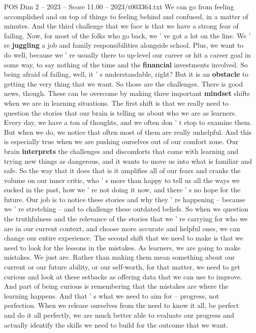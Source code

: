 \begin{textsample}{POS Dim 2 – 2023 – Score 11.00 – 2023/t003364.txt}
We can go from feeling accomplished and on top of things to feeling behind and confused, in a matter of minutes.
And the third challenge that we face is that we have a strong fear of failing.
Now, for most of the folks who go back, we ' ve got a lot on the line.
We ' re \textbf{juggling} a job and family responsibilities alongside school.
Plus, we want to do well, because we ' re usually there to up-level our career or hit a career goal in some way, to say nothing of the time and the \textbf{financial} investments involved.
So being afraid of failing, well, it ' s understandable, right?
But it is an \textbf{obstacle} to getting the very thing that we want.
So those are the challenges.
There is good news, though.
These can be overcome by making three important \textbf{mindset} shifts when we are in learning situations.
The first shift is that we really need to question the stories that our brain is telling us about who we are as learners.
Every day, we have a ton of thoughts, and we often don ' t stop to examine them.
But when we do, we notice that often most of them are really unhelpful.
And this is especially true when we are pushing ourselves out of our comfort zone.
Our brain \textbf{interprets} the challenges and discomforts that come with learning and trying new things as dangerous, and it wants to move us into what is familiar and safe.
So the way that it does that is it amplifies all of our fears and cranks the volume on our inner critic, who ' s more than happy to tell us all the ways we sucked in the past, how we ' re not doing it now, and there ' s no hope for the future.
Our job is to notice these stories and why they ' re happening -- because we ' re stretching -- and to challenge these outdated beliefs.
So when we question the truthfulness and the relevance of the stories that we ' re carrying for who we are in our current context, and choose more accurate and helpful ones, we can change our entire experience.
The second shift that we need to make is that we need to look for the lessons in the mistakes.
As learners, we are going to make mistakes.
We just are.
Rather than making them mean something about our current or our future ability, or our self-worth, for that matter, we need to get curious and look at these setbacks as offering data that we can use to improve.
And part of being curious is remembering that the mistakes are where the learning happens.
And that ' s what we need to aim for -- progress, not perfection.
When we release ourselves from the need to know it all, be perfect and do it all perfectly, we are much better able to evaluate our progress and actually identify the skills we need to build for the outcome that we want.

\end{textsample}
